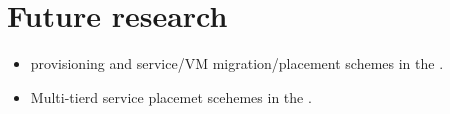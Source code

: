 \section{Future research}

\begin{itemize}
\item \Dc{} provisioning and service/VM migration/placement schemes in the \xcloud{}.
\item Multi-tierd service placemet scehemes in the \xcloud{}.
\end{itemize}